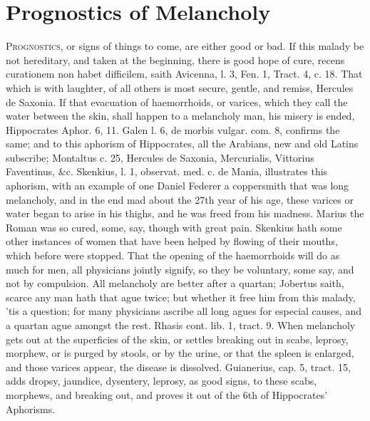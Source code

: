 \chapter{Prognostics of Melancholy}\label{ch:prognostics}

\lettrine{P}{rognostics}, or signs of things to come, are either good or bad. If
this malady be not hereditary, and taken at the beginning, there is
good hope of cure, recens curationem non habet difficilem, saith
Avicenna, l. 3, Fen. 1, Tract. 4, c. 18. That which is with laughter,
of all others is most secure, gentle, and remiss, Hercules de Saxonia.
If that evacuation of haemorrhoids, or varices, which they call
the water between the skin, shall happen to a melancholy man, his
misery is ended, Hippocrates Aphor. 6, 11. Galen l. 6, de morbis
vulgar. com. 8, confirms the same; and to this aphorism of Hippocrates,
all the Arabians, new and old Latins subscribe; Montaltus c. 25,
Hercules de Saxonia, Mercurialis, Vittorius Faventinus, \&c. Skenkius,
l. 1, observat. med. c. de Mania, illustrates this aphorism, with an
example of one Daniel Federer a coppersmith that was long melancholy,
and in the end mad about the 27th year of his age, these varices or
water began to arise in his thighs, and he was freed from his madness.
Marius the Roman was so cured, some, say, though with great pain.
Skenkius hath some other instances of women that have been helped by
flowing of their mouths, which before were stopped. That the opening of
the haemorrhoids will do as much for men, all physicians jointly
signify, so they be voluntary, some say, and not by compulsion. All
melancholy are better after a quartan; Jobertus saith, scarce any
man hath that ague twice; but whether it free him from this malady,
'tis a question; for many physicians ascribe all long agues for
especial causes, and a quartan ague amongst the rest. Rhasis
cont. lib. 1, tract. 9. When melancholy gets out at the superficies of
the skin, or settles breaking out in scabs, leprosy, morphew, or is
purged by stools, or by the urine, or that the spleen is enlarged, and
those varices appear, the disease is dissolved. Guianerius, cap. 5,
tract. 15, adds dropsy, jaundice, dysentery, leprosy, as good signs, to
these scabs, morphews, and breaking out, and proves it out of the 6th
of Hippocrates' Aphorisms.
